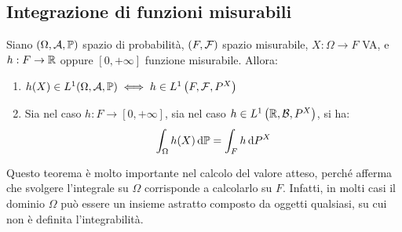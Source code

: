 \subsection{Integrazione di funzioni misurabili}
\begin{teo}\label{regola-valore-atteso}
  Siano $(\Omega,\mathcal A, \mathbb P)$ spazio di probabilità, $(F,\mathcal F)$ spazio misurabile, $X: \Omega \to F $ VA, e $h: F\to \mathbb R$ oppure $[0, +\infty]$ funzione misurabile. Allora:
    \begin{enumerate}
      \item$h(X)\in L^1 (\Omega, \mathcal A, \mathbb P) \iff h\in L^1\left(F,\mathcal F,P^X\right)$
      \item Sia nel caso $h:F\to [0, +\infty]$, sia nel caso $h \in L^1\left(\mathbb R,\mathcal B,P^X \right)$, si ha:\\
        $$\int_\Omega h(X) \, \mathrm d \mathbb P = \int_F h \, \mathrm d P^X$$
    \end{enumerate}
\end{teo}

Questo teorema è molto importante nel calcolo del valore atteso, perché afferma che svolgere l'integrale su $\Omega$ corrisponde a calcolarlo su $F$.
Infatti, in molti casi il dominio $\Omega$ può essere un insieme astratto composto da oggetti qualsiasi, su cui non è definita l'integrabilità.
\begin{figure}[H]
  \centering
  \def\drect {(-1, -1) rectangle (1, 1)}
  \label{img-regola-valore-atteso-2}
\end{figure}

